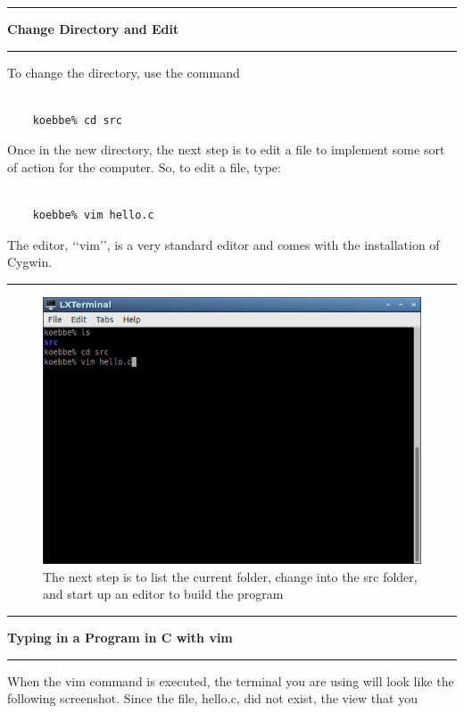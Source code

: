 \documentclass[10pt,fleqn]{article}
\begin{document}
\eject
\vskip0.1in\hrule\vskip0.1in \noindent
{\bf Change Directory and Edit} 
\vskip0.1in\hrule\vskip0.1in \noindent
To change the directory, use the command
\begin{verbatim}

    koebbe% cd src

\end{verbatim}
Once in the new directory, the next step is to edit a file to implement some
sort of action for the computer. So, to edit a file, type:
\begin{verbatim}

    koebbe% vim hello.c

\end{verbatim}
The editor, \lq\lq vim\rq\rq, is a very standard editor and comes with the
installation of Cygwin.
\vskip0.1in\hrule\vskip0.1in
\vfill
\begin{figure}[h]
\centering
\includegraphics[width=5.0in]{../images/hello_world_02.png}
\caption{The next step is to list the current folder, change into the \/src
         folder, and start up an editor to build the program}
\end{figure}
\eject
\vskip0.1in\hrule\vskip0.1in
\noindent
{\bf Typing in a Program in C with vim} 
\vskip0.1in\hrule\vskip0.1in
\noindent
When the vim command is executed, the terminal you are using will look like the
following screenshot. Since the file, hello.c, did not exist, the view that you
\end{document}
